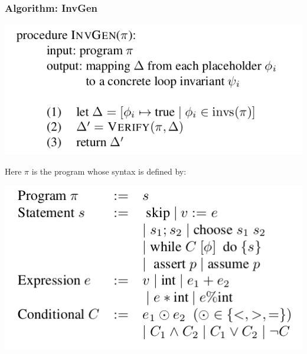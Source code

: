 \documentclass[11pt]{beamer}
\begin{document}
\begin{frame}\frametitle{Algorithm: InvGen}

\begin{center}
\includegraphics[scale=0.4]{main.png}
\end{center}
Here $\pi$ is the program whose syntax is defined by:
\begin{center}

\includegraphics[scale=0.4]{prog.png}

\end{center}

\end{frame}
\end{document}
